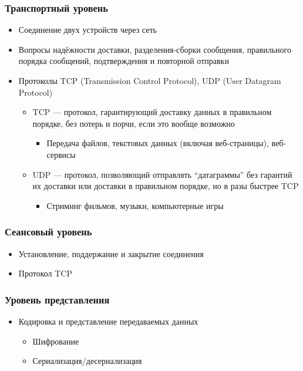 \documentclass[xetex,mathserif,serif]{beamer}
\begin{document}
	\begin{frame}
		\frametitle{Транспортный уровень}
		\begin{itemize}
			\item Соединение двух устройств через сеть
			\item Вопросы надёжности доставки, разделения-сборки сообщения, правильного порядка сообщений, подтверждения и повторной отправки
			\item Протоколы TCP (Transmission Control Protocol), UDP (User Datagram Protocol)
			\begin{itemize}
				\item TCP --- протокол, гарантирующий доставку данных в правильном порядке, без потерь и порчи, если это вообще возможно
				\begin{itemize}
					\item Передача файлов, текстовых данных (включая веб-страницы), веб-сервисы
				\end{itemize}
				\item UDP --- протокол, позволяющий отправлять ``датаграммы'' без гарантий их доставки или доставки в правильном порядке, но в разы быстрее TCP
				\begin{itemize}
					\item Стриминг фильмов, музыки, компьютерные игры
				\end{itemize}
			\end{itemize}
		\end{itemize}
	\end{frame}

	\begin{frame}
		\frametitle{Сеансовый уровень}
		\begin{itemize}
			\item Установление, поддержание и закрытие соединения
			\item Протокол TCP
		\end{itemize}
	\end{frame}

	\begin{frame}
		\frametitle{Уровень представления}
		\begin{itemize}
			\item Кодировка и представление передаваемых данных
			\begin{itemize}
				\item Шифрование
				\item Сериализация/десериализация
			\end{itemize}
		\end{itemize}
	\end{frame}
\end{document}
